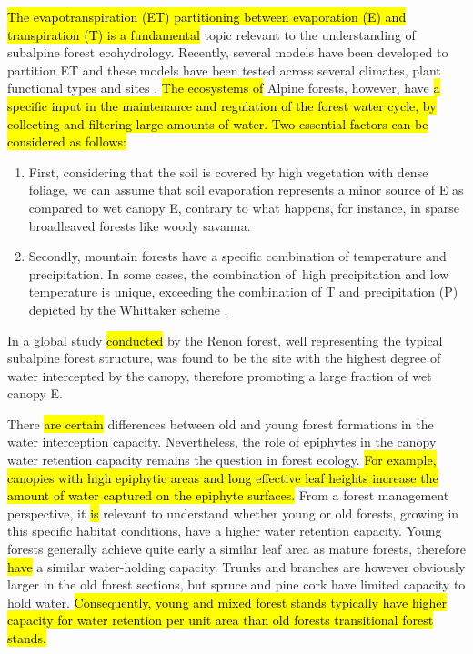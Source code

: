 \documentclass[10pt,letterpaper]{article}
\begin{document}
\hl{The evapotranspiration (ET) partitioning between evaporation (E) and transpiration (T) is a fundamental} topic relevant to the understanding of subalpine forest ecohydrology. Recently, several models have been developed to partition ET \cite{Nelsonetal2020} and these models have been tested across several climates, plant functional types and sites \cite{Nelsonetal2020}. \hl{The ecosystems of }Alpine forests, however, have \hl{a specific input in the maintenance and regulation of the forest water cycle, by collecting and filtering large amounts of water. Two essential factors can be considered as follows:} 
\begin{enumerate}
	\item First, considering that the soil is covered by high vegetation with dense foliage, we can assume that soil evaporation represents a minor source of E as compared to wet canopy E, contrary to what happens, for instance, in sparse broadleaved forests like woody savanna. 
	\item Secondly, mountain forests have a specific combination of temperature and precipitation. In some cases, the combination of high precipitation and low temperature is unique, exceeding the combination of T and precipitation (P) depicted by the Whittaker scheme \cite{Testolin}. 
\end{enumerate} 

In a global study \hl{conducted }by \cite{VANDIJK2015402} the Renon forest, well representing the typical subalpine forest structure, was found to be the site with the highest degree of water intercepted by the canopy, therefore promoting a large fraction of wet canopy E.

There \hl{are certain} differences between old and young forest formations in the water interception capacity. Nevertheless, the role of epiphytes in the canopy water retention capacity remains the question in forest ecology. \hl{For example, canopies with high epiphytic areas and long effective leaf heights increase the amount of water captured on the epiphyte surfaces. }From a forest management perspective, it \hl{is} relevant to understand whether young or old forests, growing in this specific habitat conditions, have a higher water retention capacity. Young forests generally achieve quite early a similar leaf area as mature forests, therefore \hl{have} a similar water-holding capacity. Trunks and branches are however obviously larger in the old forest sections, but spruce and pine cork have limited capacity to hold water. \hl{Consequently, young and mixed forest stands typically have higher capacity for water retention per unit area than old forests transitional forest stands.} 
\end{document}
